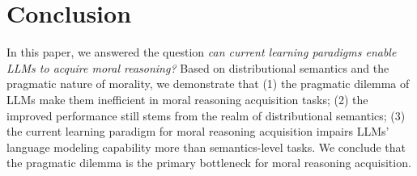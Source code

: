 \section{Conclusion}
In this paper, we answered the question \textit{can current learning paradigms enable LLMs to acquire moral reasoning?} 
Based on distributional semantics and the pragmatic nature of morality, we demonstrate that 
(1) the pragmatic dilemma of LLMs make them inefficient in moral reasoning acquisition tasks; 
(2) the improved performance still stems from the realm of distributional semantics;
(3) the current learning paradigm for moral reasoning acquisition impairs LLMs’ language modeling capability more than semantics-level tasks.
We conclude that the pragmatic dilemma is the primary bottleneck for moral reasoning acquisition.